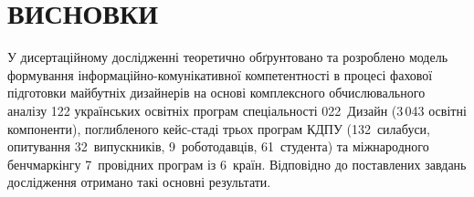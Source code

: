 \section*{\centering ВИСНОВКИ}

У дисертаційному дослідженні теоретично обґрунтовано та розроблено модель формування інформаційно-комунікативної компетентності в процесі фахової підготовки майбутніх дизайнерів на основі комплексного обчислювального аналізу 122 українських освітніх програм спеціальності 022~Дизайн (3\,043 освітні компоненти), поглибленого кейс-стаді трьох програм КДПУ (132~силабуси, опитування 32~випускників, 9~роботодавців, 61~студента) та міжнародного бенчмаркінгу 7~провідних програм із 6~країн. Відповідно до поставлених завдань дослідження отримано такі основні результати.

